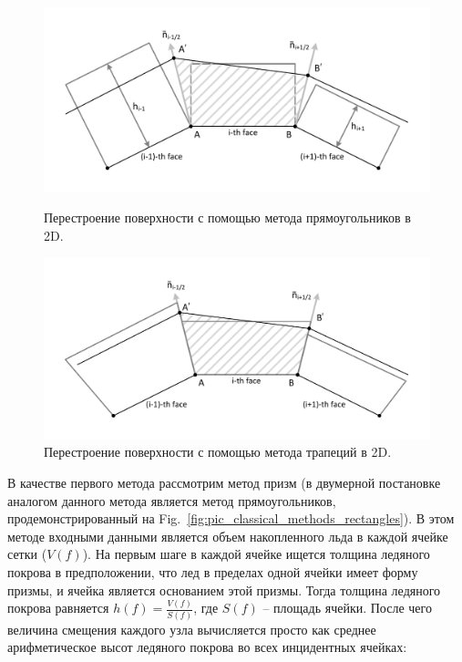\documentclass[
11pt,%
tightenlines,%
twoside,%
onecolumn,%
nofloats,%
nobibnotes,%
nofootinbib,%
superscriptaddress,%
noshowpacs,%
centertags]%
{revtex4}
\begin{document}
\begin{figure}[h]
  \centering
  \begin{minipage}[h]{0.49\textwidth}
    \includegraphics[width=\textwidth]{pics/pic_classical_methods_rectangles_size.pdf}
    \caption{Перестроение поверхности с помощью метода прямоугольников в 2D.}\label{fig:pic_classical_methods_rectangles}
  \end{minipage}
  \hfill
  \begin{minipage}[h]{0.49\textwidth}
    \includegraphics[width=\textwidth]{pics/pic_classical_methods_trapezoids_size.pdf}
    \caption{Перестроение поверхности с помощью метода трапеций в 2D.}\label{fig:pic_classical_methods_trapezoids}
  \end{minipage}
\end{figure}

В качестве первого метода рассмотрим метод призм (в двумерной постановке аналогом данного метода является метод прямоугольников, продемонстрированный на Fig.~\ref{fig:pic_classical_methods_rectangles}).
В этом методе входными данными является объем накопленного льда в каждой ячейке сетки ($V(f)$).
На первым шаге в каждой ячейке ищется толщина ледяного покрова в предположении, что лед в пределах одной ячейки имеет форму призмы, и ячейка является основанием этой призмы.
Тогда толщина ледяного покрова равняется $h(f) = \frac{V(f)}{S(f)}$, где $S(f)$ -- площадь ячейки.
После чего величина смещения каждого узла вычисляется просто как среднее арифметическое высот ледяного покрова во всех инцидентных ячейках:
\end{document}
